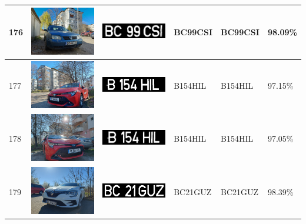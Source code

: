 \documentclass[a4paper,12pt]{report}
\begin{document}
\begin{longtable}{| m{0.6cm} | m{3cm} | m{3cm} | m{1.8cm} | m{1.8cm} | m{1.8cm} |}
    176 & \includegraphics[width=3cm,keepaspectratio]{dataset/109_s1.jpg} & \includegraphics[width=3cm,keepaspectratio]{segmentari/176.jpg} & BC99CSI             & BC99CSI              & 98.09\%    \\ \hline
    177 & \includegraphics[width=3cm,keepaspectratio]{dataset/110_d1.jpg} & \includegraphics[width=3cm,keepaspectratio]{segmentari/177.jpg} & B154HIL             & B154HIL              & 97.15\%    \\ \hline
    178 & \includegraphics[width=3cm,keepaspectratio]{dataset/110_s1.jpg} & \includegraphics[width=3cm,keepaspectratio]{segmentari/178.jpg} & B154HIL             & B154HIL              & 97.05\%    \\ \hline
    179 & \includegraphics[width=3cm,keepaspectratio]{dataset/111_d1.jpg} & \includegraphics[width=3cm,keepaspectratio]{segmentari/179.jpg} & BC21GUZ             & BC21GUZ              & 98.39\%    \\ \hline

\end{longtable}
\end{document}
